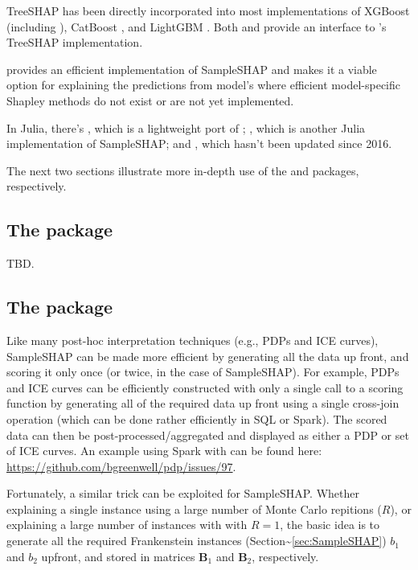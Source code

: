 TreeSHAP has been directly incorporated into most implementations of
XGBoost \citep{chen-2016-xgboost} (including 
\citep{R-xgboost}), CatBoost \citep{eronika-2017-catboost}, and LightGBM
\citep{ke-2017-lightgbm}. Both  \citep{R-fastshap} and
 \citep{R-SHAPforxgboost} provide an interface
to 's TreeSHAP implementation.

 provides an efficient implementation of SampleSHAP
and makes it a viable option for explaining the predictions from model's
where efficient model-specific Shapley methods do not exist or are not
yet implemented.

In Julia, there's , which is a lightweight port of
; , which is another Julia implementation
of SampleSHAP; and , which hasn't been updated
since 2016.

The next two sections illustrate more in-depth use of the  and
 packages, respectively.

\subsection{The  package}

TBD.

\subsection{The  package}

Like many post-hoc interpretation techniques (e.g., PDPs and ICE
curves), SampleSHAP can be made more efficient by generating all the
data up front, and scoring it only once (or twice, in the case of
SampleSHAP). For example, PDPs and ICE curves can be efficiently
constructed with only a single call to a scoring function by generating
all of the required data up front using a single cross-join operation
(which can be done rather efficiently in SQL or Spark). The scored data
can then be post-processed/aggregated and displayed as either a PDP or
set of ICE curves. An example using Spark with 
\citet{R-sparklyr} can be found here:
\url{https://github.com/bgreenwell/pdp/issues/97}.

Fortunately, a similar trick can be exploited for SampleSHAP. Whether
explaining a single instance using a large number of Monte Carlo
repitions (\(R\)), or explaining a large number of instances with with
\(R = 1\), the basic idea is to generate all the required Frankenstein
instances (Section\textasciitilde{}\ref{sec:SampleSHAP}) \(b_1\) and
\(b_2\) upfront, and stored in matrices \(\boldsymbol{B}_1\) and
\(\boldsymbol{B}_2\), respectively.

